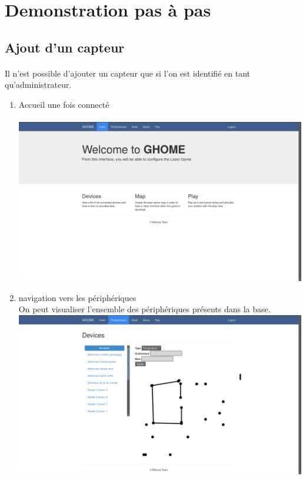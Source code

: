 \section{Demonstration pas à pas}
\subsection{Ajout d'un capteur}
\paragraph{} Il n'est possible d'ajouter un capteur que si l'on est identifié en tant qu'administrateur.

\begin{enumerate}
\item Accueil une fois connecté\\
~~\\
\includegraphics[scale=0.25]{image/homeAdmin}\\
\item navigation vers les périphériques\\
On peut visualiser l'ensemble des périphériques présents dans la base.
~~\\
\includegraphics[scale=0.25]{image/newPeriph}\\

\end{enumerate}
